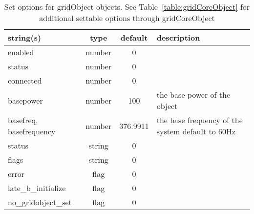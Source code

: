 \begin{table}[ht]
\centering
\begin{tabular}{p{5cm} c c p{7cm}}
\hline
string(s) & type & default & description \\
\hline
enabled & number & 0 & \\
status & number & 0 & \\
connected & number & 0 & \\
basepower & number & 100 & the base power of the object\\
basefreq, basefrequency & number & 376.9911 & the base frequency of the system default to 60Hz\\
status & string & 0 & \\
flags & string & 0 & \\
error & flag & 0 & \\
late\_b\_initialize & flag & 0 & \\
no\_gridobject\_set & flag & 0 & \\
\hline
\end{tabular}
\caption{Set options for gridObject objects. See Table~\ref{table:gridCoreObject} for additional settable options through gridCoreObject}
\label{table:gridObject}
\end{table}

